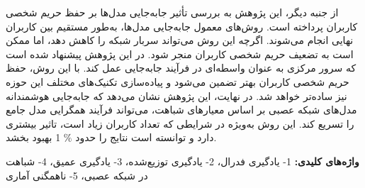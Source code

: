 \begin{small}
از جنبه دیگر، این پژوهش به بررسی تأثیر جابه‌جایی مدل‌ها بر حفظ حریم شخصی کاربران پرداخته است. روش‌های معمول جابه‌جایی مدل‌ها، به‌طور مستقیم بین کاربران نهایی انجام می‌شوند. اگرچه این روش می‌تواند سربار شبکه را کاهش دهد، اما ممکن است به تضعیف حریم شخصی کاربران منجر شود. در این پژوهش پیشنهاد شده است که سرور مرکزی به عنوان واسطه‌ای در فرآیند جابه‌جایی عمل کند. با این روش، حفظ حریم شخصی کاربران بهتر تضمین می‌شود و پیاده‌سازی تکنیک‌های مختلف این حوزه نیز ساده‌تر خواهد شد.
در نهایت، این پژوهش نشان می‌دهد که جابه‌جایی هوشمندانه مدل‌های شبکه عصبی بر اساس معیارهای شباهت، می‌تواند فرآیند همگرایی مدل جامع را تسریع کند. این روش به‌ویژه در شرایطی که تعداد کاربران زیاد است، تاثیر بیشتری دارد و توانسته است نتایج را حدود
{\footnotesize \(\%\)}%
1 بهبود بخشد.



\vspace*{0.5 cm}
\noindent\textbf{واژه‌های کلیدی:}
1- یادگیری فدرال،
2- یادگیری توزیع‌شده،
3- یادگیری عمیق،
4- شباهت در شبکه عصبی،
5- ناهمگنی آماری
\end{small}